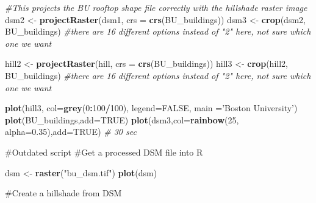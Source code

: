 \documentclass[]{article}
\newenvironment{Shaded}{\begin{snugshade}}{\end{snugshade}}
\newcommand{\CommentTok}[1]{\textcolor[rgb]{0.56,0.35,0.01}{\textit{#1}}}
\newcommand{\DataTypeTok}[1]{\textcolor[rgb]{0.13,0.29,0.53}{#1}}
\newcommand{\DecValTok}[1]{\textcolor[rgb]{0.00,0.00,0.81}{#1}}
\newcommand{\FloatTok}[1]{\textcolor[rgb]{0.00,0.00,0.81}{#1}}
\newcommand{\KeywordTok}[1]{\textcolor[rgb]{0.13,0.29,0.53}{\textbf{#1}}}
\newcommand{\NormalTok}[1]{#1}
\newcommand{\OperatorTok}[1]{\textcolor[rgb]{0.81,0.36,0.00}{\textbf{#1}}}
\newcommand{\OtherTok}[1]{\textcolor[rgb]{0.56,0.35,0.01}{#1}}
\newcommand{\StringTok}[1]{\textcolor[rgb]{0.31,0.60,0.02}{#1}}
\begin{document}
\begin{Shaded}
\begin{Highlighting}[]
\CommentTok{#This projects the BU rooftop shape file correctly with the hillshade raster image}
\NormalTok{dsm2 <-}\StringTok{ }\KeywordTok{projectRaster}\NormalTok{(dsm1, }\DataTypeTok{crs =} \KeywordTok{crs}\NormalTok{(BU_buildings))}
\NormalTok{dsm3 <-}\StringTok{ }\KeywordTok{crop}\NormalTok{(dsm2, BU_buildings) }\CommentTok{#there are 16 different options instead of "2" here, not sure which one we want}

\NormalTok{hill2 <-}\StringTok{ }\KeywordTok{projectRaster}\NormalTok{(hill, }\DataTypeTok{crs =} \KeywordTok{crs}\NormalTok{(BU_buildings))}
\NormalTok{hill3 <-}\StringTok{ }\KeywordTok{crop}\NormalTok{(hill2, BU_buildings) }\CommentTok{#there are 16 different options instead of "2" here, not sure which one we want}

\KeywordTok{plot}\NormalTok{(hill3, }\DataTypeTok{col=}\KeywordTok{grey}\NormalTok{(}\DecValTok{0}\OperatorTok{:}\DecValTok{100}\OperatorTok{/}\DecValTok{100}\NormalTok{), }\DataTypeTok{legend=}\OtherTok{FALSE}\NormalTok{, }\DataTypeTok{main =}\StringTok{'Boston University'}\NormalTok{)}
\KeywordTok{plot}\NormalTok{(BU_buildings,}\DataTypeTok{add=}\OtherTok{TRUE}\NormalTok{)}
\KeywordTok{plot}\NormalTok{(dsm3,}\DataTypeTok{col=}\KeywordTok{rainbow}\NormalTok{(}\DecValTok{25}\NormalTok{, }\DataTypeTok{alpha=}\FloatTok{0.35}\NormalTok{),}\DataTypeTok{add=}\OtherTok{TRUE}\NormalTok{) }\CommentTok{# 30 sec}
\end{Highlighting}
\end{Shaded}

\#Outdated script \#Get a processed DSM file into R

\begin{Shaded}
\begin{Highlighting}[]
\NormalTok{dsm <-}\StringTok{ }\KeywordTok{raster}\NormalTok{(}\StringTok{"bu_dsm.tif"}\NormalTok{)}
\KeywordTok{plot}\NormalTok{(dsm)}
\end{Highlighting}
\end{Shaded}

\#Create a hillshade from DSM
\end{document}

